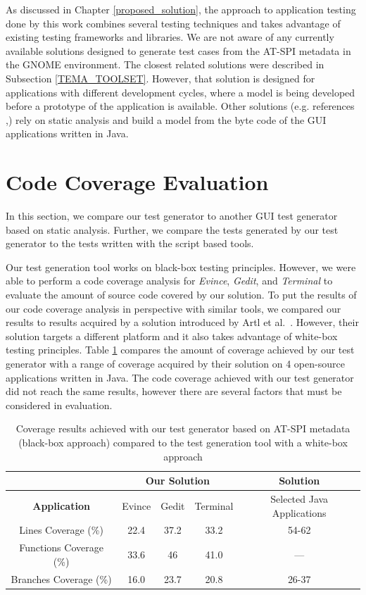 As discussed in Chapter \ref{proposed_solution}, the approach to application testing done by this work combines several testing techniques and takes advantage of existing testing frameworks and libraries. We are not aware of any currently available solutions designed to generate test cases from the AT-SPI metadata in the GNOME environment. The closest related solutions were described in Subsection \ref{TEMA_TOOLSET}. However, that solution is designed for applications with different development cycles, where a model is being developed before a prototype of the application is available. Other solutions (e.g. references \cite{ReisJacinto2018Aetw},\cite{ArltS2012LSAf}) rely on static analysis and build a model from the byte code of the GUI applications written in Java.

\section{Code Coverage Evaluation}\label{code_coverage_evaluation}
In this section, we compare our test generator to another GUI test generator based on static analysis. Further, we compare the tests generated by our test generator to the tests written with the script based tools. 

Our test generation tool works on black-box testing principles. However, we were able to perform a code coverage analysis for \textit{Evince}, \textit{Gedit}, and \textit{Terminal} to evaluate the amount of source code covered by our solution.  To put the results of our code coverage analysis in perspective with similar tools, we compared our results to results acquired by a solution introduced by Artl et al.~\cite{ArltS2012LSAf}. However, their solution targets a different platform and it also takes advantage of white-box testing principles.
Table \ref{table} compares the amount of coverage achieved by our test generator with a range of coverage acquired by their solution on 4 open-source applications written in Java. The code coverage achieved with our test generator did not reach the same results, however there are several factors that must be considered in evaluation. 

\begin{table}[htb!]
\centering
\label{table}
\begin{tabular}{|c||c|c|c|c|}
\hline
 & \multicolumn{3}{c|}{\textbf{Our Solution}} & \textbf{Solution}\cite{ArltS2012LSAf} \\
\hline
\textbf{Application} &  Evince & Gedit & Terminal & Selected Java Applications   \\
\hline
\hline
Lines Coverage (\%) & 22.4  & 37.2  & 33.2   & 54-62    \\
\hline
Functions Coverage (\%) & 33.6 & 46 & 41.0  &  --- \\
\hline
Branches Coverage (\%) & 16.0 & 23.7 & 20.8 & 26-37  \\
\hline
\end{tabular}
\caption{Coverage results achieved with our test generator based on AT-SPI metadata (black-box approach) compared to the test generation tool\cite{ArltS2012LSAf} with a white-box approach}
\end{table}

